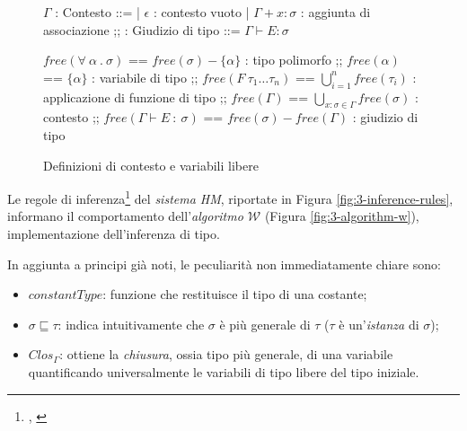 \begin{figure}
    \vspace{4mm}
    \begin{bnf}
        $\Gamma$ : \small{Contesto} ::=
        | $\epsilon$ : \small{contesto vuoto}
        | $\Gamma + x \colon \sigma$ : \small{aggiunta di associazione}
        ;;
        : \small{Giudizio di tipo} ::= $\Gamma \vdash E \colon \sigma$
    \end{bnf}
    \par\vspace{12mm}
    \begin{bnf}
        $free(\forall\ \alpha\ .\ \sigma)$ == $free(\sigma) - \{\alpha\}$ : \small{tipo polimorfo}
        ;;
        $free(\alpha)$ == $\{\alpha\}$ : \small{variabile di tipo}
        ;;
        $free(F\ \tau_1\ldots\tau_n)$ == $\bigcup\limits_{i=1}^{n} free(\tau_i)$ : \small{applicazione di funzione di tipo}
        ;;
        $free(\Gamma)$ == $\bigcup\limits_{x\colon\sigma\in\Gamma} free(\sigma)$ : \small{contesto}
        ;;
        $free(\Gamma\vdash E\ \colon\ \sigma)$ == $free(\sigma) - free(\Gamma)$ : \small{giudizio di tipo}
    \end{bnf}
    \caption{Definizioni di contesto e variabili libere}
    \label{fig:3-context-free-variables}
    \vspace{4mm}
\end{figure}

\newpage

\noindent Le regole di inferenza\footnote{, \cite{SimpleApplicativeLanguageMiniML}}
del \textit{sistema HM}, riportate in Figura \ref{fig:3-inference-rules},
informano il comportamento dell'\textit{algoritmo $\mathcal{W}$} (Figura \ref{fig:3-algorithm-w}), implementazione dell'inferenza di tipo.

\noindent In aggiunta a principi già noti, le peculiarità non immediatamente chiare sono:
\begin{itemize}
    \item $constantType$: funzione che restituisce il tipo di una costante;
    \item $\sigma \sqsubseteq \tau$: indica intuitivamente che $\sigma$ è più generale di $\tau$
          ($\tau$ è un'\textit{istanza} di $\sigma$);
    \item $Clos_\Gamma$: ottiene la \textit{chiusura}, ossia tipo più generale, di una variabile
          quantificando universalmente le variabili di tipo libere del tipo iniziale.
\end{itemize}

